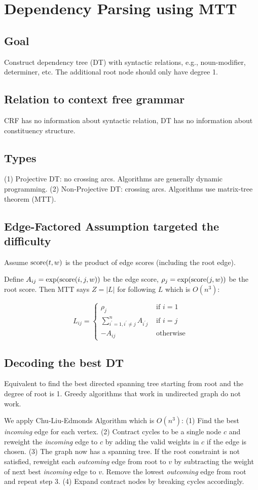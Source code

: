 \section{Dependency Parsing using MTT}

\subsection*{Goal} Construct dependency tree (DT) with syntactic relations, e.g., noun-modifier, determiner, etc. The additional root node should only have degree 1.

\subsection*{Relation to context free grammar}
CRF has no information about syntactic relation, DT has no information about constituency structure.

\subsection*{Types} 
(1) Projective DT: no crossing arcs. Algorithms are generally dynamic programming.
(2) Non-Projective DT: crossing arcs. Algorithms use matrix-tree theorem (MTT).


\subsection*{Edge-Factored Assumption targeted the difficulty}
Assume $\text{score}(t,w)$ is the product of edge scores (including the root edge).

Define $A_{ij}=\exp(\text{score}(i,j,w))$ be the edge score, $\rho_j = \exp(\text{score}(j,w))$ be the root score. Then MTT says $Z=|L|$ for following $L$ which is $O(n^3)$:

$$
L_{i j}= \begin{cases}\rho_{j} & \text { if } i=1 \\ \sum_{i^{\prime}=1, i^{\prime} \neq j}^{n} A_{i^{\prime} j} & \text { if } i=j \\ -A_{i j} & \text { otherwise }\end{cases}
$$

\subsection*{Decoding the best DT}
Equivalent to find the best directed spanning tree starting from root and the degree of root is 1. Greedy algorithms that work in undirected graph do not work.

We apply Chu-Liu-Edmonds Algorithm which is $O(n^3)$:
(1) Find the best \emph{incoming} edge for each vertex. 
(2) Contract cycles to be a single node $c$ and reweight the \emph{incoming} edge to $c$ by adding the valid weights in $c$ if the edge is chosen. 
(3) The graph now has a spanning tree. If the root constraint is not satisfied, reweight each \emph{outcoming} edge from root to $v$ by subtracting the weight of next best \emph{incoming} edge to $v$. Remove the lowest \emph{outcoming} edge from root and repeat step 3. 
(4) Expand contract nodes by breaking cycles accordingly.